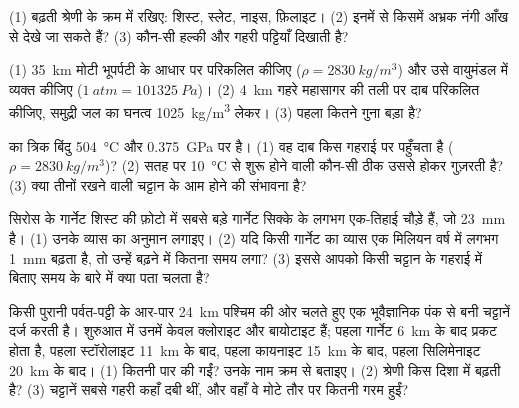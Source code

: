 \begin{exercise}[$\star$]\label{exo:g12:metamorphic-rocks:5}
(1) बढ़ती श्रेणी के क्रम में रखिए: शिस्ट, स्लेट, नाइस, फ़िलाइट। (2) इनमें से
किसमें अभ्रक नंगी आँख से देखे जा सकते हैं? (3) कौन-सी
हल्की और गहरी पट्टियाँ दिखाती है?
\end{exercise}

\begin{exercise}[$\star\star$]\label{exo:g12:metamorphic-rocks:6}
(1) \qty{35}{km} मोटी भूपर्पटी के आधार पर  परिकलित कीजिए
($\rho = \qty{2830}{kg/m^3}$) और उसे वायुमंडल में व्यक्त कीजिए
($\qty{1}{atm} = \qty{101325}{Pa}$)। (2) \qty{4}{km} गहरे महासागर की तली पर
दाब परिकलित कीजिए, समुद्री जल का घनत्व
\qty{1025}{kg/m^3} लेकर। (3) पहला कितने गुना बड़ा है?
\end{exercise}

\begin{exercise}[$\star\star$]\label{exo:g12:metamorphic-rocks:7}
 का त्रिक बिंदु \qty{504}{\celsius} और
\qty{0.375}{GPa} पर है। (1) वह दाब किस गहराई पर पहुँचता है ($\rho =
\qty{2830}{kg/m^3}$)? (2) सतह पर \qty{10}{\celsius} से शुरू होने वाली कौन-सी
 ठीक उससे होकर गुज़रती है? (3) क्या तीनों  रखने वाली चट्टान
के आम होने की संभावना है?
\end{exercise}

\begin{exercise}[$\star\star$]\label{exo:g12:metamorphic-rocks:8}
सिरोस के गार्नेट शिस्ट की फ़ोटो में सबसे बड़े गार्नेट
सिक्के के लगभग एक-तिहाई चौड़े हैं, जो \qty{23}{mm} है। (1) उनके
व्यास का अनुमान लगाइए। (2) यदि किसी गार्नेट का व्यास एक मिलियन वर्ष में लगभग \qty{1}{mm}
बढ़ता है, तो उन्हें बढ़ने में कितना समय लगा? (3) इससे आपको किसी
चट्टान के गहराई में बिताए समय के बारे में क्या पता चलता है?
\end{exercise}

\begin{exercise}[$\star\star$]\label{exo:g12:metamorphic-rocks:9}
किसी पुरानी पर्वत-पट्टी के आर-पार \qty{24}{km} पश्चिम की ओर चलते हुए एक भूवैज्ञानिक
पंक से बनी चट्टानें दर्ज करती है। शुरुआत में उनमें केवल क्लोराइट और बायोटाइट
हैं; पहला गार्नेट \qty{6}{km} के बाद प्रकट होता है, पहला स्टॉरोलाइट
\qty{11}{km} के बाद, पहला कायनाइट \qty{15}{km} के बाद, पहला सिलिमेनाइट
\qty{20}{km} के बाद। (1) कितनी  पार की गईं? उनके नाम क्रम से बताइए।
(2) श्रेणी किस दिशा में बढ़ती है? (3) चट्टानें सबसे गहरी कहाँ दबी थीं,
और वहाँ वे मोटे तौर पर कितनी गरम हुईं?
\end{exercise}

